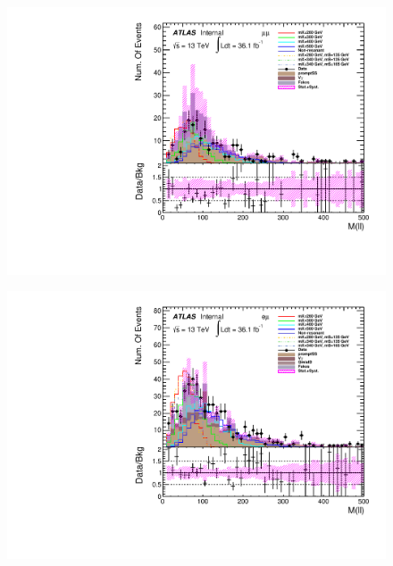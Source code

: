 \begin{figure}[h]
\begin{minipage}[t]{0.33\linewidth}
 \label{fig:dataMC_high_Njet_CR:m_ll_ee.pdf}
 \end{minipage}
 \begin{minipage}[t]{0.33\linewidth}
 \centering
 \includegraphics[width=1.0\textwidth,angle=-90]{fig/dataMC_high_Njet_CR/m_ll_mumu.pdf}
 \label{fig:dataMC_high_Njet_CR:m_ll_mumu.pdf}
 \end{minipage}
 \begin{minipage}[t]{0.33\linewidth}
 \centering
 \includegraphics[width=1.0\textwidth,angle=-90]{fig/dataMC_high_Njet_CR/m_ll_emu.pdf}
 \label{fig:dataMC_high_Njet_CR:m_ll_emu.pdf}
 \end{minipage}
\begin{minipage}[t]{0.33\linewidth}
 \centering

\end{minipage}
\end{figure}
